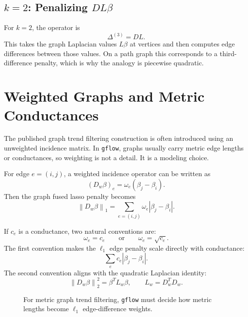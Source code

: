 \documentclass[11pt]{article}
\newcommand{\norm}[1]{\left\lVert #1 \right\rVert}
\begin{document}
\subsection{\(k=2\): Penalizing \(DL\beta\)}

For \(k=2\), the operator is
\[
  \Delta^{(3)} = DL.
\]
This takes the graph Laplacian values \(L\beta\) at vertices and then computes
edge differences between those values.  On a path graph this corresponds to a
third-difference penalty, which is why the analogy is piecewise quadratic.

\section{Weighted Graphs and Metric Conductances}

The published graph trend filtering construction is often introduced using an
unweighted incidence matrix.  In \texttt{gflow}, graphs usually carry metric
edge lengths or conductances, so weighting is not a detail.  It is a modeling
choice.

For edge \(e=(i,j)\), a weighted incidence operator can be written as
\[
  (D_w\beta)_e
  =
  \omega_e(\beta_j-\beta_i).
\]
Then the graph fused lasso penalty becomes
\[
  \norm{D_w\beta}_1
  =
  \sum_{e=(i,j)}\omega_e|\beta_j-\beta_i|.
\]

If \(c_e\) is a conductance, two natural conventions are:
\[
  \omega_e = c_e
  \qquad\text{or}\qquad
  \omega_e = \sqrt{c_e}.
\]
The first convention makes the \(\ell_1\) edge penalty scale directly with
conductance:
\[
  \sum_e c_e|\beta_j-\beta_i|.
\]
The second convention aligns with the quadratic Laplacian identity:
\[
  \norm{D_w\beta}_2^2 = \beta^T L_w\beta,
  \qquad
  L_w = D_w^T D_w.
\]

\begin{figure}[ht]
\centering
{}
\caption{For metric graph trend filtering, \texttt{gflow} must decide how
metric lengths become \(\ell_1\) edge-difference weights.}
\end{figure}
\end{document}
